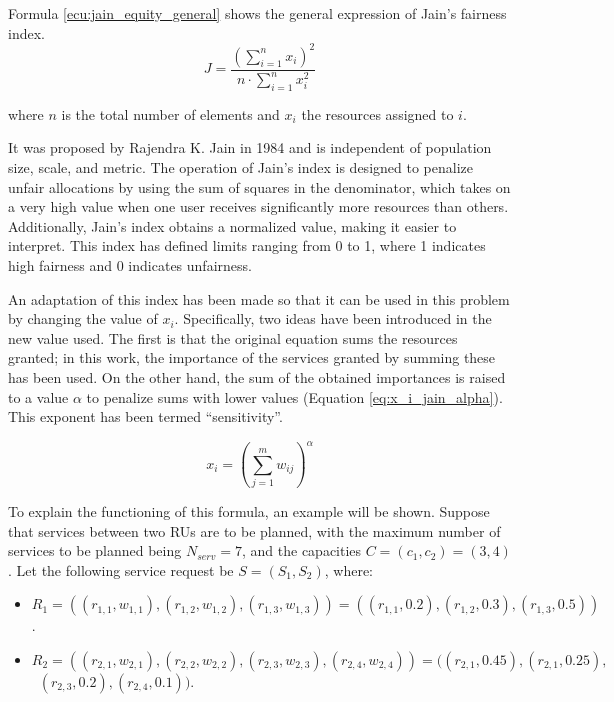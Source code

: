 \documentclass[preprint,12pt]{elsarticle}
\begin{document}
Formula \ref{ecu:jain_equity_general} shows the general expression of Jain's fairness index. 
\begin{equation}\label{ecu:jain_equity_general}
    J = \frac{\left( \sum_{i=1}^{n} x_i \right)^2}{n \cdot \sum_{i=1}^{n} x_i^2}
\end{equation}

where $n$ is the total number of elements and $x_i$ the resources assigned to $i$.

It was proposed by Rajendra K. Jain in 1984 and is independent of population size, scale, and metric. The operation of Jain's index is designed to penalize unfair allocations by using the sum of squares in the denominator, which takes on a very high value when one user receives significantly more resources than others. Additionally, Jain's index obtains a normalized value, making it easier to interpret. This index has defined limits ranging from 0 to 1, where 1 indicates high fairness and 0 indicates unfairness.

An adaptation of this index has been made so that it can be used in this problem by changing the value of $x_i$. Specifically, two ideas have been introduced in the new value used. The first is that the original equation sums the resources granted; in this work, the importance of the services granted by summing these has been used. On the other hand, the sum of the obtained importances is raised to a value $\alpha$ to penalize sums with lower values (Equation \ref{eq:x_i_jain_alpha}). This exponent has been termed ``sensitivity''.

\begin{equation}
x_i = \left(\sum_{j=1}^{m} w_{ij}\right)^\alpha
\label{eq:x_i_jain_alpha}
\end{equation}

To explain the functioning of this formula, an example will be shown. Suppose that services between two RUs are to be planned, with the maximum number of services to be planned being $N_{serv} = 7$, and the capacities $C = (c_1, c_2) = (3,4)$. Let the following service request be $S = (S_1,S_2)$, where:
\begin{itemize}
    \item $R_1 = ( (r_{1,1},w_{1,1}),(r_{1,2},w_{1,2}),(r_{1,3},w_{1,3})) = ( (r_{1,1},0.2),(r_{1,2},0.3),(r_{1,3},0.5))$.
    \item $R_2 = ( (r_{2,1},w_{2,1}),(r_{2,2},w_{2,2}),(r_{2,3},w_{2,3}),(r_{2,4},w_{2,4})) = ( (r_{2,1},0.45),(r_{2,1},0.25),$ \ 
    $(r_{2,3},0.2),(r_{2,4},0.1))$.
\end{itemize}
\end{document}
